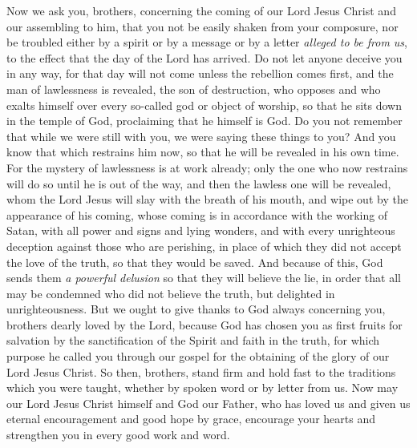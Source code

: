 \begin{biblechapter} %
 Now we ask you, brothers, concerning the coming of our Lord Jesus Christ and our assembling to him,
\verse that you not be easily shaken from your composure, nor be troubled either by a spirit or by a message or by a letter \textit{alleged to be from us}, to the effect that the day of the Lord has arrived.
\verse Do not let anyone deceive you in any way, for that day will not come unless the rebellion comes first, and the man of lawlessness is revealed, the son of destruction,
\verse who opposes and who exalts himself over every so-called god or object of worship, so that he sits down in the temple of God, proclaiming that he himself is God.
\verse Do you not remember that while we were still with you, we were saying these things to you?
\verse And you know that which restrains him now, so that he will be revealed in his own time.
\verse For the mystery of lawlessness is at work already; only the one who now restrains will do so until he is out of the way,
\verse and then the lawless one will be revealed, whom the Lord Jesus will slay with the breath of his mouth, and wipe out by the appearance of his coming,
\verse whose coming is in accordance with the working of Satan, with all power and signs and lying wonders,
\verse and with every unrighteous deception against those who are perishing, in place of which they did not accept the love of the truth, so that they would be saved.
\verse And because of this, God sends them \textit{a powerful delusion} so that they will believe the lie,
\verse in order that all may be condemned who did not believe the truth, but delighted in unrighteousness.
 But we ought to give thanks to God always concerning you, brothers dearly loved by the Lord, because God has chosen you as first fruits for salvation by the sanctification of the Spirit and faith in the truth,
\verse for which purpose he called you through our gospel for the obtaining of the glory of our Lord Jesus Christ.
\verse So then, brothers, stand firm and hold fast to the traditions which you were taught, whether by spoken word or by letter from us.
\verse Now may our Lord Jesus Christ himself and God our Father, who has loved us and given us eternal encouragement and good hope by grace,
\verse encourage your hearts and strengthen you in every good work and word.
\end{biblechapter}

